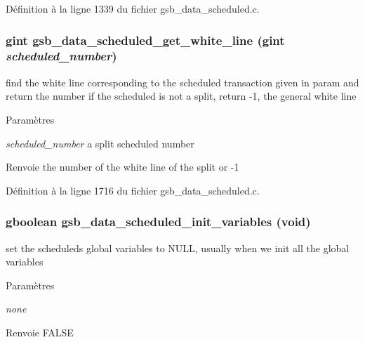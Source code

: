 Définition à la ligne 1339 du fichier gsb\_\-data\_\-scheduled.c.

\subsubsection[{gsb\_\-data\_\-scheduled\_\-get\_\-white\_\-line}]{\setlength{\rightskip}{0pt plus 5cm}gint gsb\_\-data\_\-scheduled\_\-get\_\-white\_\-line (gint {\em scheduled\_\-number})}\label{gsb__data__scheduled_8h_aac0788953cfa89ce5393e02e2b22d655}
find the white line corresponding to the scheduled transaction given in param and return the number if the scheduled is not a split, return -\/1, the general white line


\begin{DoxyParams}{Paramètres}
\item[{\em scheduled\_\-number}]a split scheduled number\end{DoxyParams}
\begin{DoxyReturn}{Renvoie}
the number of the white line of the split or -\/1 
\end{DoxyReturn}


Définition à la ligne 1716 du fichier gsb\_\-data\_\-scheduled.c.

\subsubsection[{gsb\_\-data\_\-scheduled\_\-init\_\-variables}]{\setlength{\rightskip}{0pt plus 5cm}gboolean gsb\_\-data\_\-scheduled\_\-init\_\-variables (void)}\label{gsb__data__scheduled_8h_a51f5cc190c15cd32d416a85460ac60a8}
set the scheduleds global variables to NULL, usually when we init all the global variables 
\begin{DoxyParams}{Paramètres}
\item[{\em none}]\end{DoxyParams}
\begin{DoxyReturn}{Renvoie}
FALSE 
\end{DoxyReturn}


